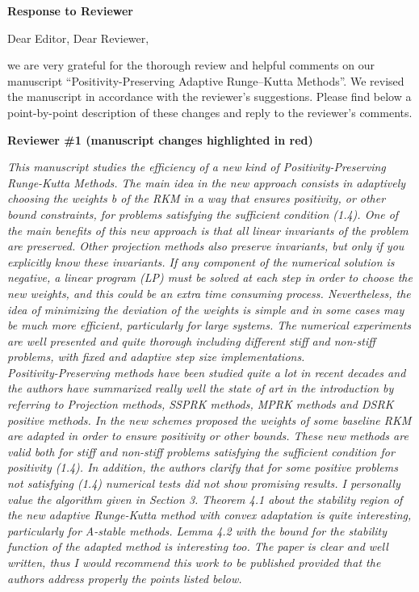 \documentclass[11pt]{letter}
\newcommand{\revA}[1]{{\color{red}#1}}
\begin{document}
\begin{letter}{}

\textbf{Response to Reviewer}

\opening{Dear Editor, Dear Reviewer,}

we are very grateful for the thorough review and helpful comments on our manuscript
``Positivity-Preserving Adaptive Runge--Kutta Methods''.
We revised the manuscript in accordance with the reviewer's suggestions.
Please find below a point-by-point description of these changes and reply to
the reviewer's comments.



\textbf{\large Reviewer \#1 \revA{(manuscript changes highlighted in red)}}

\emph{%
This manuscript studies the efficiency of a new kind of Positivity-Preserving
Runge-Kutta Methods. The main idea in the new approach consists in adaptively
choosing the weights b of the RKM in a way that ensures positivity, or other
bound constraints, for problems satisfying the sufficient condition (1.4).
One of the main benefits of this new approach is that all linear invariants of
the problem are preserved. Other projection methods also preserve invariants,
but only if you explicitly know these invariants. If any component of the
numerical solution is negative, a linear program (LP) must be solved at
each step in order to choose the new weights, and this could be an extra time
consuming process. Nevertheless, the idea of minimizing the deviation of the
weights is simple and in some cases may be much more efficient, particularly
for large systems. The numerical experiments are well presented and quite
thorough including different stiff and non-stiff problems, with fixed and
adaptive step size implementations.
\\
Positivity-Preserving methods have been studied quite a lot in recent decades
and the authors have summarized really well the state of art in the introduction
by referring to Projection methods, SSPRK methods, MPRK methods and DSRK positive
methods. In the new schemes proposed the weights of some baseline RKM are adapted
in order to ensure positivity or other bounds. These new methods are valid both
for stiff and non-stiff problems satisfying the sufficient condition for
positivity (1.4). In addition, the authors clarify that for some positive
problems not satisfying (1.4) numerical tests did not show promising results.
I personally value the algorithm given in Section 3. Theorem 4.1 about the
stability region of the new adaptive Runge-Kutta method with convex adaptation
is quite interesting, particularly for A-stable methods. Lemma 4.2 with the
bound for the stability function of the adapted method is interesting too. The
paper is clear and well written, thus I would recommend this work to be published
provided that the authors address properly the points listed below.
}


\end{letter}
\end{document}
